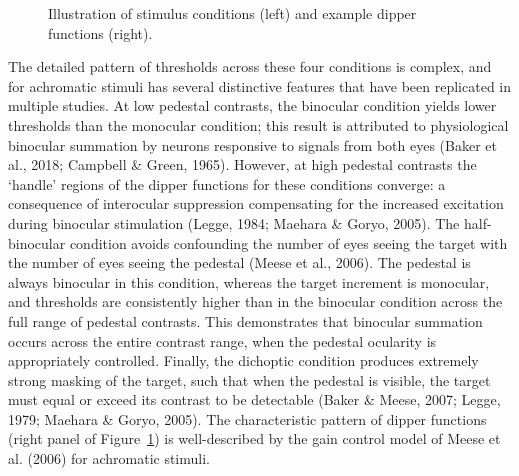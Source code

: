 \documentclass[
  letterpaper,
  DIV=11,
  numbers=noendperiod]{scrartcl}
\begin{document}
\begin{figure}


\caption{\label{fig-exampledips}Illustration of stimulus conditions
(left) and example dipper functions (right).}

\end{figure}%

The detailed pattern of thresholds across these four conditions is
complex, and for achromatic stimuli has several distinctive features
that have been replicated in multiple studies. At low pedestal
contrasts, the binocular condition yields lower thresholds than the
monocular condition; this result is attributed to physiological
binocular summation by neurons responsive to signals from both eyes
(Baker et al., 2018; Campbell \& Green, 1965). However, at high pedestal
contrasts the `handle' regions of the dipper functions for these
conditions converge: a consequence of interocular suppression
compensating for the increased excitation during binocular stimulation
(Legge, 1984; Maehara \& Goryo, 2005). The half-binocular condition
avoids confounding the number of eyes seeing the target with the number
of eyes seeing the pedestal (Meese et al., 2006). The pedestal is always
binocular in this condition, whereas the target increment is monocular,
and thresholds are consistently higher than in the binocular condition
across the full range of pedestal contrasts. This demonstrates that
binocular summation occurs across the entire contrast range, when the
pedestal ocularity is appropriately controlled. Finally, the dichoptic
condition produces extremely strong masking of the target, such that
when the pedestal is visible, the target must equal or exceed its
contrast to be detectable (Baker \& Meese, 2007; Legge, 1979; Maehara \&
Goryo, 2005). The characteristic pattern of dipper functions (right
panel of Figure~\ref{fig-exampledips}) is well-described by the gain
control model of Meese et al. (2006) for achromatic stimuli.
\end{document}
